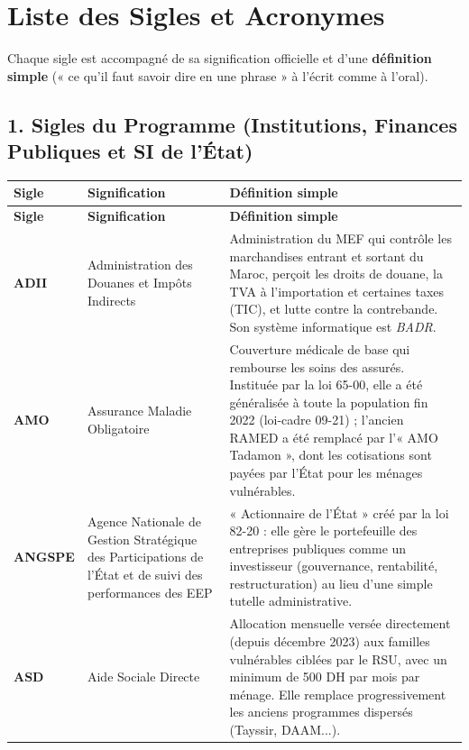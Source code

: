 \chapter*{Liste des Sigles et Acronymes}

Chaque sigle est accompagné de sa signification officielle et d'une \textbf{définition simple} (« ce qu'il faut savoir dire en une phrase » à l'écrit comme à l'oral).

\section*{1. Sigles du Programme (Institutions, Finances Publiques et SI de l'État)}

{\small
\begin{longtable}{|p{1.8cm}|p{4.9cm}|p{8.8cm}|}
\hline
\rowcolor{gray!20} \textbf{Sigle} & \textbf{Signification} & \textbf{Définition simple} \\ \hline
\endfirsthead
\hline
\rowcolor{gray!20} \textbf{Sigle} & \textbf{Signification} & \textbf{Définition simple} \\ \hline
\endhead
\textbf{ADII} & Administration des Douanes et Impôts Indirects & Administration du MEF qui contrôle les marchandises entrant et sortant du Maroc, perçoit les droits de douane, la TVA à l'importation et certaines taxes (TIC), et lutte contre la contrebande. Son système informatique est \textit{BADR}. \\ \hline
\textbf{AMO} & Assurance Maladie Obligatoire & Couverture médicale de base qui rembourse les soins des assurés. Instituée par la loi 65-00, elle a été généralisée à toute la population fin 2022 (loi-cadre 09-21) ; l'ancien RAMED a été remplacé par l'« AMO Tadamon », dont les cotisations sont payées par l'État pour les ménages vulnérables. \\ \hline
\textbf{ANGSPE} & Agence Nationale de Gestion Stratégique des Participations de l'État et de suivi des performances des EEP & « Actionnaire de l'État » créé par la loi 82-20 : elle gère le portefeuille des entreprises publiques comme un investisseur (gouvernance, rentabilité, restructuration) au lieu d'une simple tutelle administrative. \\ \hline
\textbf{ASD} & Aide Sociale Directe & Allocation mensuelle versée directement (depuis décembre 2023) aux familles vulnérables ciblées par le RSU, avec un minimum de 500 DH par mois par ménage. Elle remplace progressivement les anciens programmes dispersés (Tayssir, DAAM...). \\ \hline

\end{longtable}}
